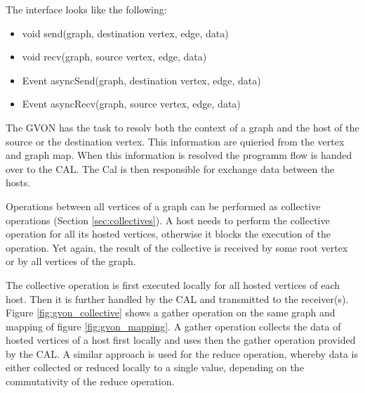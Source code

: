 
The interface looks like the following:

\begin{itemize}
  \item void send(graph, destination vertex, edge, data)
  \item void recv(graph, source vertex, edge, data)
  \item Event asyncSend(graph, destination vertex, edge, data)
  \item Event asyncRecv(graph, source vertex, edge, data)
\end{itemize}

The GVON has the task to resolv both the context of a graph and the
host of the source or the destination vertex. This information are
quieried from the vertex and graph map. When this information is
resolved the programm flow is handed over to the CAL. The Cal is then
responsible for exchange data between the hosts.

Operations between all vertices of a graph can be performed as
collective operations (Section \ref{sec:collectives}). A host needs to
perform the collective operation for all its hosted vertices,
otherwise it blocks the execution of the operation. Yet again,
the result of the collective is received by some root vertex
or by all vertices of the graph.


The collective operation is first executed locally for all hosted
vertices of each host. Then it is further handled by the CAL and
transmitted to the receiver(s). Figure \ref{fig:gvon_collective} shows
a gather operation on the same graph and mapping of figure
\ref{fig:gvon_mapping}. A gather operation collects the data of hosted
vertices of a host first locally and uses then the gather operation
provided by the CAL. A similar approach is used for the reduce
operation, whereby data is either collected or reduced locally to a
single value, depending on the commutativity of the reduce
operation. 



